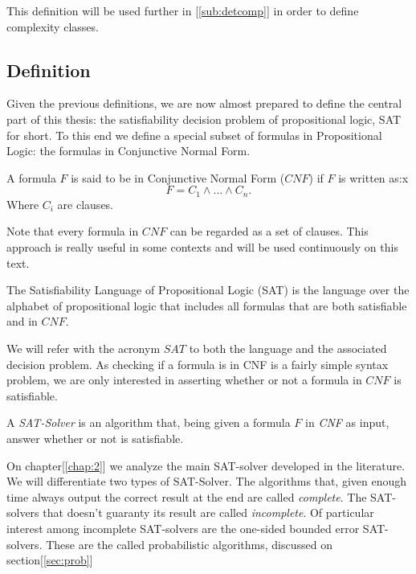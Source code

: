 This definition will be used further in [\ref{sub:detcomp}] in order to define complexity classes.


\subsection{Definition}

Given the previous definitions, we are now almost prepared to define the central part of this thesis: the satisfiability decision problem of propositional logic, SAT for short. To this end we define a special subset of formulas in Propositional Logic: the formulas in Conjunctive Normal Form.

\begin{definition}
  A formula $F$ is said to be in Conjunctive Normal Form ($CNF$) if $F$ is written as:x
  $$F = C_1\wedge ... \wedge C_n.$$
  Where $C_i$  are clauses.
\end{definition}

Note that every formula in $CNF$ can be regarded as a set of clauses. This approach is really useful in some contexts and will be used continuously on this text.

\begin{definition}
  The Satisfiability Language of Propositional Logic (SAT) is the language over the alphabet of propositional logic that includes all formulas that are both satisfiable and in $CNF$.
\end{definition}

We will refer with the acronym $SAT$ to both the language and the associated decision problem. As checking if a formula is in CNF is a fairly simple syntax problem, we are only interested in asserting whether or not a formula in $CNF$ is satisfiable.

\begin{definition}
  A \emph{SAT-Solver} is an algorithm that, being given a formula $F$ in \emph{CNF} as input, answer whether or not is satisfiable.
\end{definition}

On chapter[\ref{chap:2}] we analyze the main SAT-solver developed in the literature. We will differentiate two types of SAT-Solver. The algorithms that, given enough time always output the correct result at the end are called \emph{complete}. The SAT-solvers that doesn't guaranty its result are called \emph{incomplete}. Of particular interest among incomplete SAT-solvers are the one-sided bounded error SAT-solvers. These are the called probabilistic algorithms, discussed on section[\ref{sec:prob}]


